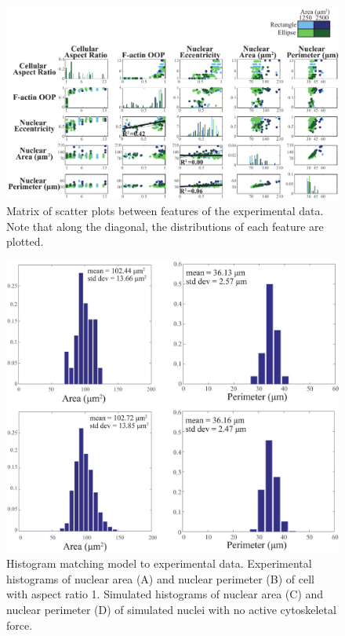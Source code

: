 \begin{figure}[h]
\centering
\captionsetup{width=.9\linewidth}
\includegraphics[width=7in]{Project3/figs/Nancy_data.pdf}
\caption{Matrix of scatter plots between features of the experimental data. Note that along the diagonal, the distributions of each feature are plotted. }
\label{fig::scattermatrix}
\end{figure}


\begin{figure}[h]
\centering
\captionsetup{width=.9\linewidth}
\includegraphics[width=7in]{Project3/figs/matching_histograms_areaandperim.eps}
\caption{Histogram matching model to experimental data. Experimental histograms of nuclear area (A) and nuclear perimeter (B) of cell with aspect ratio 1. Simulated histograms of nuclear area (C) and nuclear perimeter (D) of simulated nuclei with no active cytoskeletal force.}
\label{fig::histos}
\end{figure}

